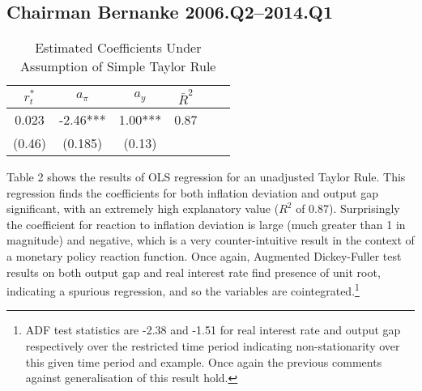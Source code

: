 \documentclass[notitlepage,12pt]{article}
\begin{document}
\subsection{Chairman Bernanke 2006.Q2--2014.Q1}
\begin{table}[H]
\centering
\caption{Estimated Coefficients Under Assumption of Simple Taylor Rule}
\begin{tabular}{ccc|ccc}
$r_{t}^{*}$ & $a_{\pi }$ & $a_{y}$ & ${\bar R}^2$\\
\toprule
0.023&-2.46*** &1.00***& 0.87\\
(0.46)& (0.185) & (0.13) \\
\midrule
\bottomrule
\end{tabular}
\end{table}
Table 2 shows the results of OLS regression for an unadjusted Taylor Rule. This regression finds the coefficients for both inflation deviation and output gap significant, with an extremely high explanatory value ($R^2$ of 0.87).  Surprisingly the coefficient for reaction to inflation deviation is large (much greater than 1 in magnitude) and negative, which is a very counter-intuitive result in the context of a monetary policy reaction function.  Once again, Augmented Dickey-Fuller test results on both output gap and real interest rate find presence of unit root, indicating a spurious regression, and so the variables are cointegrated.\footnote{ADF test statistics are -2.38 and -1.51 for real interest rate and output gap respectively over the restricted time period indicating non-stationarity over this given time period and example.  Once again the previous comments against generalisation of this result hold.} 
\end{document}
